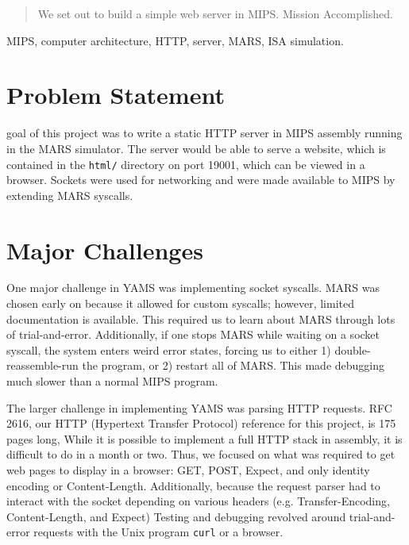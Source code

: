 \documentclass[journal,10pt]{IEEEtran}
\begin{document}
\maketitle

\begin{abstract}
We set out to build a simple web server in MIPS. Mission Accomplished.
\end{abstract}

\begin{IEEEkeywords}
MIPS, computer architecture, HTTP, server, MARS, ISA simulation.
\end{IEEEkeywords}


\section{Problem Statement}
%
%
 goal of this project was to write a static HTTP server in
MIPS assembly running in the MARS simulator. The server would be able to serve a
website, which is contained in the \texttt{html/} directory on port 19001, which
can be viewed in a browser. Sockets were used for networking and were made
available to MIPS by extending MARS syscalls.


\section{Major Challenges}

One major challenge in YAMS was implementing socket syscalls.
MARS was chosen early on because it allowed for custom syscalls; however,
limited documentation is available. This required us to learn about MARS
through lots of trial-and-error. Additionally, if one stops MARS while
waiting on a socket syscall, the system enters weird error states, forcing
us to either 1) double-reassemble-run the program, or 2) restart all of MARS.
This made debugging much slower than a normal MIPS program.

The larger challenge in implementing YAMS was parsing HTTP requests. RFC
2616\cite{Leach}, our HTTP (Hypertext Transfer Protocol) reference for this
project, is 175 pages long, While it is possible to implement a full HTTP stack
in assembly, it is difficult to do in a month or two. Thus, we focused on what
was required to get web pages to display in a browser: GET, POST, Expect, and
only identity encoding or Content-Length. Additionally, because the request
parser had to interact with the socket depending on various headers (e.g.
Transfer-Encoding, Content-Length, and Expect) Testing and debugging revolved
around trial-and-error requests with the Unix program \texttt{curl} or a browser.
\end{document}
